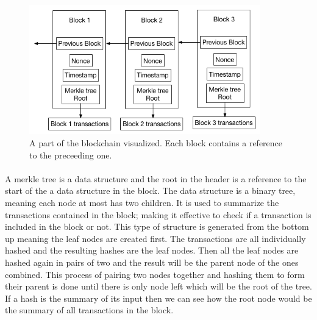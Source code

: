 \documentclass[informationsecurity]{gucmasterproject}
\begin{document}
\begin{figure}[h]
    \centering
    \includegraphics[width=10cm]{figs/blockchain.png}
    \caption{A part of the blockchain visualized. Each block contains a reference to the preceeding one.}
    \label{fig:blockchain}
\end{figure}


\paragraph{}
A merkle tree is a data structure and the root in the header is a reference to the start of the a data structure in the block. The data structure is a binary tree, meaning each node at most has two children. It is used to summarize the transactions contained in the block; making it effective to check if a transaction is included in the block or not. This type of structure is generated from the bottom up meaning the leaf nodes are created first. The transactions are all individually hashed and the resulting hashes are the leaf nodes. Then all the leaf nodes are hashed again in pairs of two and the result will be the parent node of the ones combined. This process of pairing two nodes together and hashing them to form their parent is done until there is only node left which will be the root of the tree. If a hash is the summary of its input then we can see how the root node would be the summary of all transactions in the block.
\end{document}
